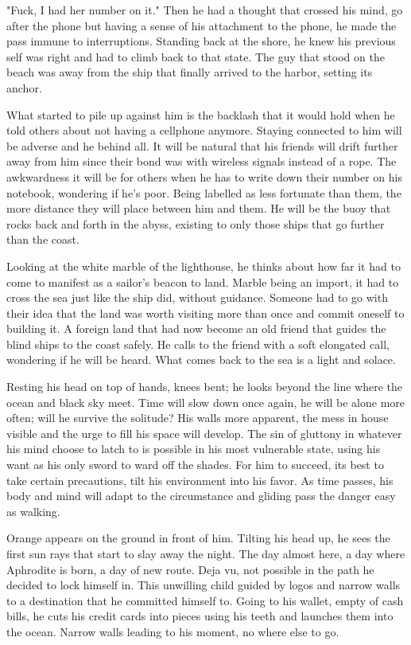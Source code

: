 \begin{Document}
        "Fuck, I had her number on it." Then he had a thought that crossed his mind, go after the phone but having a sense of his attachment to the phone, he
    made the pass immune to interruptions. Standing back at the shore, he knew his previous self was right and had to climb back to that state. The guy that
    stood on the beach was away from the ship that finally arrived to the harbor, setting its anchor.

        What started to pile up against him is the backlash that it would hold when he told others about not having a cellphone anymore. Staying connected to
    him will be adverse and he behind all. It will be natural that his friends will drift further away from him since their bond was with wireless signals
    instead of a rope. The awkwardness it will be for others when he has to write down their number on his notebook, wondering if he's poor. Being labelled as
    less fortunate than them, the more distance they will place between him and them. He will be the buoy that rocks back and forth in the abyss, existing
    to only those ships that go further than the coast.

        Looking at the white marble of the lighthouse, he thinks about how far it had to come to manifest as a sailor's beacon to land. Marble being an import,
    it had to cross the sea just like the ship did, without guidance. Someone had to go with their idea that the land was worth visiting more than once and
    commit oneself to building it. A foreign land that had now become an old friend that guides the blind ships to the coast safely. He calls to the friend with
    a soft elongated call, wondering if he will be heard. What comes back to the sea is a light and solace.

       Resting his head on top of hands, knees bent; he looks beyond the line where the ocean and black sky meet. Time will slow down once again, he will
    be alone more often; will he survive the solitude? His walls more apparent, the mess in house visible and the urge to fill his space will develop. 
    The sin of gluttony in whatever his mind choose to latch to is possible in his most vulnerable state, using his want as his only sword to ward off the
    shades. For him to succeed, its best to take certain precautions, tilt his environment into his favor. As time passes, his body and mind will adapt to
    the circumstance and gliding pass the danger easy as walking.

        Orange appears on the ground in front of him. Tilting his head up, he sees the first sun rays that start to slay away the night. The day almost here, a
    day where Aphrodite is born, a day of new route. Deja vu, not possible in the path he decided to lock himself in. This unwilling child guided by logos and
    narrow walls to a destination that he committed himself to. Going to his wallet, empty of cash bills, he cuts his credit cards into pieces using his teeth
    and launches them into the ocean. Narrow walls leading to his moment, no where else to go.


\end{Document}
